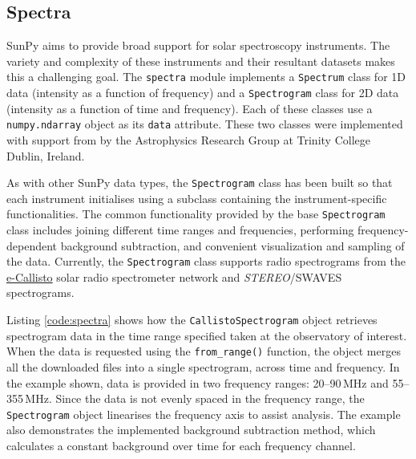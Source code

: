 \subsection{Spectra}\label{sec:spectra}
SunPy aims to provide broad support for solar spectroscopy
instruments.  The variety and complexity of these instruments and
their resultant datasets makes this a challenging goal.  The \texttt{spectra} module implements a
\texttt{Spectrum} class for 1D data (intensity as a function of frequency) and a
\texttt{Spectrogram} class for 2D data (intensity as a function of time and
frequency).  Each of these classes use a \texttt{numpy.ndarray} object
as its \texttt{data} attribute.  These two classes were implemented
with support from by the Astrophysics Research Group at Trinity
College Dublin, Ireland.

As with other SunPy data types, the \texttt{Spectrogram} class has been
built so that each instrument initialises using a subclass containing the instrument-specific 
functionalities. The common functionality provided by the base \texttt{Spectrogram} class includes
joining different time ranges and frequencies, performing frequency-dependent background subtraction,
and convenient visualization and sampling of the data.
Currently, the \texttt{Spectrogram} class supports radio spectrograms from the 
\href{http://www.e-callisto.org/}{e-Callisto}
solar radio spectrometer network and \textit{STEREO}/SWAVES spectrograms.

Listing \ref{code:spectra} shows how the \texttt{CallistoSpectrogram}
object retrieves spectrogram data in the time range specified taken at
the observatory of interest.  When the data is requested using the
\texttt{from\_range()} function, the object merges all the downloaded
files into a single spectrogram, across time and frequency.
In the example shown, data is provided in two frequency ranges:
20--90\,MHz and 55--355\,MHz.  Since the data is not evenly spaced in
the frequency range, the \texttt{Spectrogram} object linearises the
frequency axis to assist analysis.  The example also demonstrates
the implemented background subtraction method, which calculates
a constant background over time for each frequency channel.


